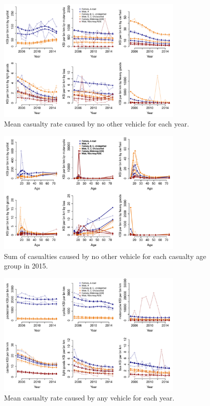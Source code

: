 \documentclass{article}
\begin{document}
\begin{figure}[H]
\centering
\includegraphics[width=0.8\textwidth]{NOVpredYear.pdf}
\caption{\small Mean casualty rate caused by no other vehicle for each year.}
\label{NOVpredYear}
\end{figure}

\begin{figure}[H]
\centering
\includegraphics[width=0.8\textwidth]{NOVpredAge2015.pdf}
\caption{\small Sum of casualties caused by no other vehicle for each casualty age group in 2015.}
\label{NOVpredAge2015}
\end{figure}

\begin{figure}[H]
\centering
\includegraphics[width=0.8\textwidth]{pred6year.pdf}
\caption{\small Mean casualty rate caused by any vehicle for each year.}
\label{pred6year}
\end{figure}
\end{document}
